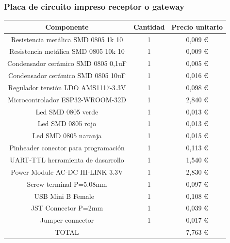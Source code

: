 \documentclass[a4paper ,12pt, onecolumn]{article}
\begin{document}
            \subsubsection{Placa de circuito impreso receptor o gateway}
                \begin{center}
                    \begin{tabular}{||c | c |c ||} 
                    \hline
                    Componente & Cantidad & Precio unitario  \\ [0.5ex] 
                    \hline
                    Resistencia metálica SMD 0805 1k 10  	&1&	 0,009 € \\ 
                    Resistencia metálica SMD 0805 10k 10 	&1&	 0,009 € \\ 
                    Condensador cerámico SMD 0805 0,1uF  	&1&	 0,005 € \\ 
                    Condensador cerámico SMD 0805 10uF   	&1&	 0,016 € \\ 
                    Regulador tensión LDO AMS1117-3.3V   	&1&	 0,098 € \\ 
                    Microcontrolador ESP32-WROOM-32D     	&1&	 2,840 € \\ 
                    Led SMD 0805 verde                   	&1&	 0,013 € \\ 
                    Led SMD 0805 rojo                    	&1&	 0,013 € \\ 
                    Led SMD 0805 naranja                 	&1&	 0,015 € \\ 
                    Pinheader conector para programación 	&1&	 0,113 € \\ 
                    UART-TTL herramienta de dasarrollo   	&1&	 1,540 € \\ 
                    Power Module AC-DC HI-LINK 3.3V	        &1&	 2,830 € \\ 
                    Screw terminal P=5.08mm	                &1&	 0,097 € \\ 
                    USB Mini B Female                    	&1&	 0,108 € \\ 
                    JST Connector P=2mm                  	&1&	 0,039 € \\ 
                    Jumper connector	                    &1&	 0,017 € \\ 
                    \hline
                    TOTAL                    	            &&	 7,763 € \\ 
                    \end{tabular}
                \end{center}
\end{document}
